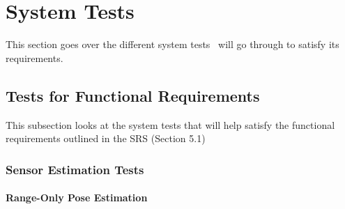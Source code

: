 \documentclass[12pt, titlepage]{article}
\begin{document}

\section{System Tests}\label{sec_sys-tests}

This section goes over the different system tests \progname~will go through to satisfy its requirements.


\subsection{Tests for Functional Requirements}



This subsection looks at the system tests that will help satisfy the functional requirements outlined in the SRS (Section 5.1)

\subsubsection{Sensor Estimation Tests}


		
\paragraph{Range-Only Pose Estimation}
\end{document}
